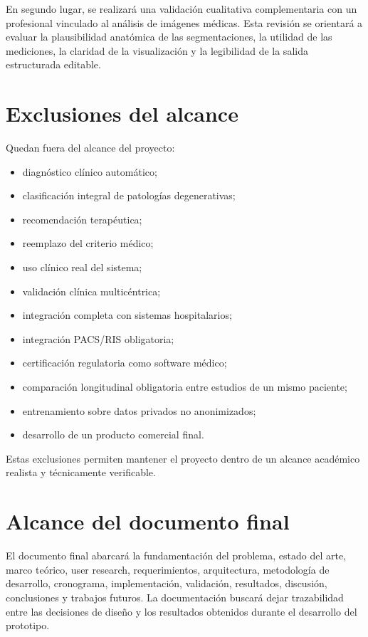 En segundo lugar, se realizar\'a una validaci\'on cualitativa complementaria con un profesional vinculado al an\'alisis de im\'agenes m\'edicas. Esta revisi\'on se orientar\'a a evaluar la plausibilidad anat\'omica de las segmentaciones, la utilidad de las mediciones, la claridad de la visualizaci\'on y la legibilidad de la salida estructurada editable.

\section{Exclusiones del alcance}

Quedan fuera del alcance del proyecto:

\begin{itemize}
    \item diagn\'ostico cl\'inico autom\'atico;
    \item clasificaci\'on integral de patolog\'ias degenerativas;
    \item recomendaci\'on terap\'eutica;
    \item reemplazo del criterio m\'edico;
    \item uso cl\'inico real del sistema;
    \item validaci\'on cl\'inica multic\'entrica;
    \item integraci\'on completa con sistemas hospitalarios;
    \item integraci\'on PACS/RIS obligatoria;
    \item certificaci\'on regulatoria como software m\'edico;
    \item comparaci\'on longitudinal obligatoria entre estudios de un mismo paciente;
    \item entrenamiento sobre datos privados no anonimizados;
    \item desarrollo de un producto comercial final.
\end{itemize}

Estas exclusiones permiten mantener el proyecto dentro de un alcance acad\'emico realista y t\'ecnicamente verificable.

\section{Alcance del documento final}

El documento final abarcar\'a la fundamentaci\'on del problema, estado del arte, marco te\'orico, user research, requerimientos, arquitectura, metodolog\'ia de desarrollo, cronograma, implementaci\'on, validaci\'on, resultados, discusi\'on, conclusiones y trabajos futuros. La documentaci\'on buscar\'a dejar trazabilidad entre las decisiones de dise\~no y los resultados obtenidos durante el desarrollo del prototipo.
